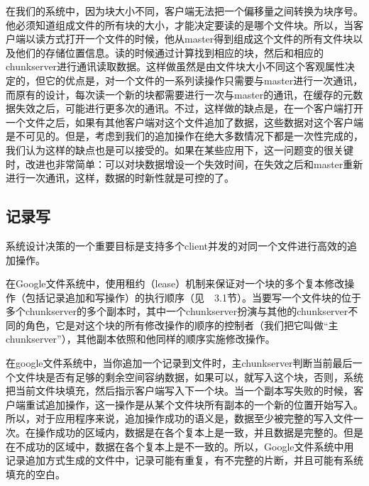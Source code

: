 \documentclass[11pt,a4paper]{scrartcl} %
\begin{document}
\begin{CJK*}{UTF8}{gbsn}
在我们的系统中，因为块大小不同，客户端无法把一个偏移量之间转换为块序号。他必须知道组成文件的所有块的大小，才能决定要读的是哪个文件块。所以，当客户端以读方式打开一个文件的时候，他从master得到组成这个文件的所有文件块以及他们的存储位置信息。读的时候通过计算找到相应的块，然后和相应的chunkserver进行通讯读取数据。这样做虽然是由文件块大小不同这个客观属性决定的，但它的优点是，对一个文件的一系列读操作只需要与master进行一次通讯，而原有的设计，每次读一个新的块都需要进行一次与master的通讯，在缓存的元数据失效之后，可能进行更多次的通讯。不过，这样做的缺点是，在一个客户端打开一个文件之后，如果有其他客户端对这个文件追加了数据，这些数据对这个客户端是不可见的。但是，考虑到我们的追加操作在绝大多数情况下都是一次性完成的，我们认为这样的缺点也是可以接受的。如果在某些应用下，这一问题变的很关键时，改进也非常简单：可以对块数据增设一个失效时间，在失效之后和master重新进行一次通讯，这样，数据的时新性就是可控的了。
\subsection{记录写}
系统设计决策的一个重要目标是支持多个client并发的对同一个文件进行高效的追加操作。

在Google文件系统中，使用租约（lease）机制来保证对一个块的多个复本修改操作（包括记录追加和写操作）的执行顺序（见~\cite{gfs2003}~3.1节）。当要写一个文件块的位于多个chunkserver的多个副本时，其中一个chunkserver扮演与其他的chunkserver不同的角色，它是对这个块的所有修改操作的顺序的控制者（我们把它叫做“主chunkserver”），其他副本依照和他同样的顺序实施修改操作。

在google文件系统中，当你追加一个记录到文件时，主chunkserver判断当前最后一个文件块是否有足够的剩余空间容纳数据，如果可以，就写入这个块，否则，系统把当前文件块填充，然后指示客户端写入下一个块。当一个副本写失败的时候，客户端重试追加操作，这一操作是从某个文件块所有副本的一个新的位置开始写入。所以，对于应用程序来说，追加操作成功的语义是，数据至少被完整的写入文件一次。在操作成功的区域内，数据是在各个复本上是一致，并且数据是完整的。但是在不成功的区域中，数据在各个复本上是不一致的。所以，Google文件系统中用记录追加方式生成的文件中，记录可能有重复，有不完整的片断，并且可能有系统填充的空白。


\end{CJK*}
\end{document}
